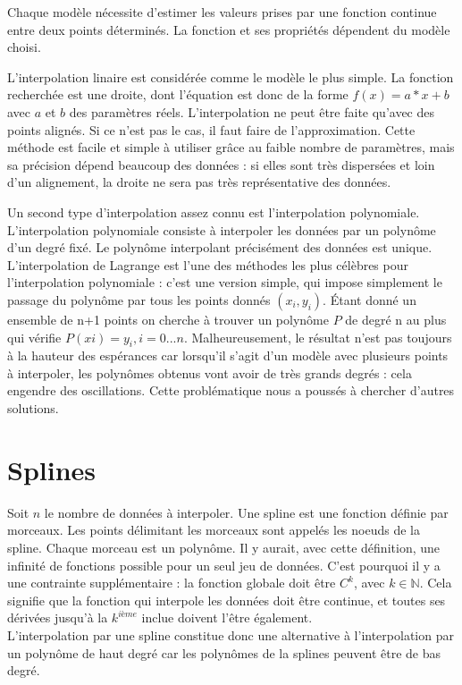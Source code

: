 \documentclass[a4paper,12pt]{article} %
\begin{document}
    Chaque modèle nécessite d'estimer les valeurs prises par une fonction continue entre deux points déterminés. La fonction et ses propriétés dépendent du modèle choisi. 
	
	L'interpolation linaire est considérée comme le modèle le plus simple. La fonction recherchée est une droite, dont l'équation est donc de la forme $f(x)=a*x+b$ avec $a$ et $b$ des paramètres réels. L'interpolation ne peut être faite qu'avec des points alignés. Si ce n'est pas le cas, il faut faire de l'approximation. Cette méthode est facile et simple à utiliser grâce au faible nombre de paramètres, mais sa précision dépend beaucoup des données : si elles sont très dispersées et loin d'un alignement, la droite ne sera pas très représentative des données.
	
    Un second type d'interpolation assez connu est l'interpolation polynomiale. L'interpolation polynomiale consiste à interpoler les données par un polynôme d'un degré fixé. Le polynôme interpolant précisément des données est unique. L'interpolation de Lagrange est l'une des méthodes les plus célèbres pour l'interpolation polynomiale : c'est une version simple, qui impose simplement le passage du polynôme par tous les points donnés $(x_i,y_i)$. Étant donné un ensemble de n+1 points  on cherche à trouver un polynôme $P$ de degré n au plus qui vérifie $P(xi)=y_i  ,i=0...n$. Malheureusement, le résultat n'est pas toujours à la hauteur des espérances car lorsqu'il s'agit d'un modèle avec plusieurs points à interpoler, les polynômes obtenus vont avoir de très grands degrés : cela engendre des oscillations. Cette problématique nous a poussés à chercher d'autres solutions. 

	\section{Splines}
	    Soit $n$ le nombre de données à interpoler.
	    Une spline est une fonction définie par morceaux. Les points délimitant les morceaux sont appelés les noeuds de la spline. Chaque morceau est un polynôme. Il y aurait, avec cette définition, une infinité de fonctions possible pour un seul jeu de données. C'est pourquoi il y a une contrainte supplémentaire : la fonction globale doit être $C^k$, avec $k\in\mathbb{N}$. Cela signifie que la fonction qui interpole les données doit être continue, et toutes ses dérivées jusqu'à la $k^{ième}$ inclue doivent l'être également.\\
	    
	    L'interpolation par une spline constitue donc une alternative à l'interpolation par un polynôme de haut degré car les polynômes de la splines peuvent être de bas degré.\\
		
\end{document}
